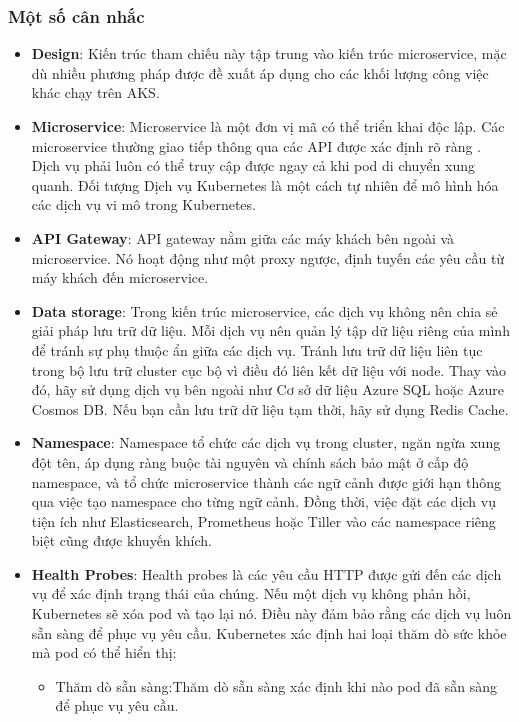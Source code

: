 \subsubsection{Một số cân nhắc}
\begin{itemize}
    \item \textbf{Design}: Kiến trúc tham chiếu này tập trung vào kiến trúc microservice, mặc dù nhiều phương pháp được đề xuất áp dụng cho các khối lượng công việc khác chạy trên AKS.
    \item \textbf{Microservice}: Microservice là một đơn vị mã có thể triển khai độc lập. Các microservice thường giao tiếp thông qua các API được xác định rõ ràng . Dịch vụ phải luôn có thể truy cập được ngay cả khi pod di chuyển xung quanh. Đối tượng Dịch vụ Kubernetes là một cách tự nhiên để mô hình hóa các dịch vụ vi mô trong Kubernetes.
    \item \textbf{API Gateway}: API gateway nằm giữa các máy khách bên ngoài và microservice. Nó hoạt động như một proxy ngược, định tuyến các yêu cầu từ máy khách đến microservice.
    \item \textbf{Data storage}: Trong kiến trúc microservice, các dịch vụ không nên chia sẻ giải pháp lưu trữ dữ liệu. Mỗi dịch vụ nên quản lý tập dữ liệu riêng của mình để tránh sự phụ thuộc ẩn giữa các dịch vụ.
Tránh lưu trữ dữ liệu liên tục trong bộ lưu trữ cluster cục bộ vì điều đó liên kết dữ liệu với node. Thay vào đó, hãy sử dụng dịch vụ bên ngoài như Cơ sở dữ liệu Azure SQL hoặc Azure Cosmos DB. Nếu bạn cần lưu trữ dữ liệu tạm thời, hãy sử dụng Redis Cache.
    \item \textbf{Namespace}: Namespace tổ chức các dịch vụ trong cluster, ngăn ngừa xung đột tên, áp dụng ràng buộc tài nguyên và chính sách bảo mật ở cấp độ namespace, và tổ chức microservice thành các ngữ cảnh được giới hạn thông qua việc tạo namespace cho từng ngữ cảnh. Đồng thời, việc đặt các dịch vụ tiện ích như Elasticsearch, Prometheus hoặc Tiller vào các namespace riêng biệt cũng được khuyến khích.
    \item \textbf{Health Probes}: Health probes là các yêu cầu HTTP được gửi đến các dịch vụ để xác định trạng thái của chúng. Nếu một dịch vụ không phản hồi, Kubernetes sẽ xóa pod và tạo lại nó. Điều này đảm bảo rằng các dịch vụ luôn sẵn sàng để phục vụ yêu cầu.
    \newline
    Kubernetes xác định hai loại thăm dò sức khỏe mà pod có thể hiển thị:
        \begin{itemize}
            \item Thăm dò sẵn sàng:Thăm dò sẵn sàng xác định khi nào pod đã sẵn sàng để phục vụ yêu cầu.  

\end{itemize}
\end{itemize}
